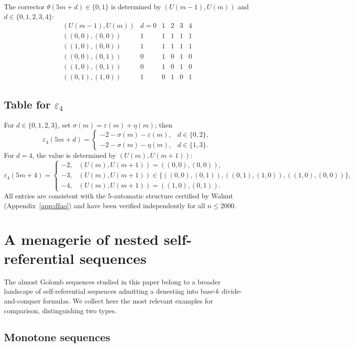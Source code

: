 \documentclass[12pt]{article}
\theoremstyle{definition}
\theoremstyle{remark}
\begin{document}
The corrector $\theta(5m+d)\in\{0,1\}$ is determined by $(U(m-1),U(m))$ and
$d\in\{0,1,2,3,4\}$:
\[
\begin{array}{c|ccccc}
(U(m-1),U(m)) & d=0&1&2&3&4\\\hline
((0,0),(0,0)) & 1&1&1&1&1\\
((1,0),(0,0)) & 1&1&1&1&1\\
((0,0),(0,1)) & 0&1&0&1&0\\
((1,0),(0,1)) & 0&1&0&1&0\\
((0,1),(1,0)) & 1&0&1&0&1
\end{array}
\]

\subsection*{Table for $\varepsilon_4$}

For $d\in\{0,1,2,3\}$, set $\sigma(m)=\varepsilon(m)+\eta(m)$; then
\[
  \varepsilon_4(5m+d) =
  \begin{cases}
    -2-\sigma(m)-\varepsilon(m), & d\in\{0,2\},\\
    -2-\sigma(m)-\eta(m), & d\in\{1,3\}.
  \end{cases}
\]
For $d=4$, the value is determined by $(U(m),U(m+1))$:
\[
  \varepsilon_4(5m+4) =
  \begin{cases}
    -2,& (U(m),U(m+1))=((0,0),(0,0)),\\
    -3,& (U(m),U(m+1))\in\bigl\{((0,0),(0,1)),((0,1),(1,0)),((1,0),(0,0))\bigr\},\\
    -4,& (U(m),U(m+1))=((1,0),(0,1)).
  \end{cases}
\]
All entries are consistent with the $5$-automatic structure certified
by Walnut (Appendix~\ref{app:dfao}) and have been verified independently
for all $n\le 2000$.

\section{A menagerie of nested self-referential sequences}\label{app:nested}

The almost Golomb sequences studied in this paper belong to a broader landscape of
self-referential sequences admitting a denesting into base-$k$
divide-and-conquer formulas. We collect here the most relevant examples
for comparison, distinguishing two types.

\subsection*{Monotone sequences}
\end{document}
